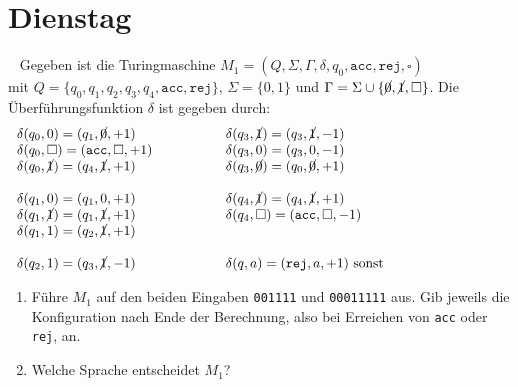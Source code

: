 \documentclass{uebung_cs}
\begin{document}
\section*{Dienstag}

\begin{exercise}\
	Gegeben ist die Turingmaschine $M_1 = (Q,\Sigma,\Gamma,\delta,q_0,\texttt{acc},\mathtt{rej},\square)$\\
	mit
	$Q = \{q_0,q_1,q_2,q_3,q_4,\mathtt{acc},\mathtt{rej}\}$, $\Sigma = \{0,1\}$ und $\Gamma = \Sigma \cup \{\cancel{0},\cancel{1},\square\}$. Die Überführungsfunktion $\delta$ ist gegeben durch:
	\[
		\begin{tabular}{p{5cm}p{7.2cm}}
			$\delta(q_0,0) = (q_1,\cancel{0},+1)$              & $\delta(q_3,\cancel{1}) = (q_3,\cancel{1},-1)$     \\
			$\delta(q_0,\square) = (\mathtt{acc},\square ,+1)$ & $\delta(q_3,0) = (q_3,0,-1)$                       \\
			$\delta(q_0,\cancel{1}) = (q_4,\cancel{1},+1)$     & $\delta(q_3,\cancel{0}) = (q_0,\cancel{0},+1)$     \\
			                                                   &                                                    \\
			$\delta(q_1,0) = (q_1,0,+1)$                       & $\delta(q_4,\cancel{1}) = (q_4,\cancel{1},+1)$     \\
			$\delta(q_1,\cancel{1}) = (q_1,\cancel{1},+1)$     & $\delta(q_4,\square) = (\mathtt{acc},\square ,-1)$ \\
			$\delta(q_1,1) = (q_2,\cancel{1},+1)$              &                                                    \\
			                                                   &                                                    \\
			$\delta(q_2,1) = (q_3,\cancel{1},-1)$              & $\delta(q,a) = (\mathtt{rej},a,+1)$ sonst          \\
		\end{tabular}
	\]

	\begin{enumerate}
		\item\easy
		      Führe $M_1$ auf den beiden Eingaben \texttt{001111} und \texttt{00011111} aus. Gib jeweils die Konfiguration nach Ende der Berechnung, also bei Erreichen von \texttt{acc} oder \texttt{rej}, an.
		\item\mittel
		      Welche Sprache entscheidet $M_1$?
	\end{enumerate}
\end{exercise}
\end{document}
